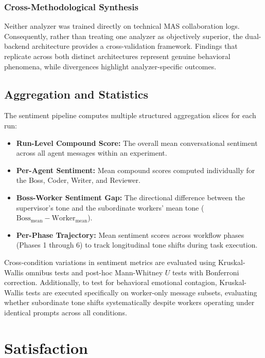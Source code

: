 \subsubsection{Cross-Methodological Synthesis}
\label{subsubsec:cross-methodological-synthesis}

Neither analyzer was trained directly on technical \ac{MAS} collaboration logs.
Consequently, rather than treating one analyzer as objectively superior, the dual-backend architecture provides a cross-validation framework.
Findings that replicate across both distinct architectures represent genuine behavioral phenomena, while divergences highlight analyzer-specific outcomes.

\subsection{Aggregation and Statistics}
\label{subsec:sentiment-aggregation-statistics}

The sentiment pipeline computes multiple structured aggregation slices for each run:
\begin{itemize}
    \item \textbf{Run-Level Compound Score:} The overall mean conversational sentiment across all agent messages within an experiment.
    \item \textbf{Per-Agent Sentiment:} Mean compound scores computed individually for the Boss, Coder, Writer, and Reviewer.
    \item \textbf{Boss-Worker Sentiment Gap:} The directional difference between the supervisor's tone and the subordinate workers' mean tone ($\text{Boss}_{\text{mean}} - \text{Worker}_{\text{mean}}$).
    \item \textbf{Per-Phase Trajectory:} Mean sentiment scores across workflow phases (Phases 1 through 6) to track longitudinal tone shifts during task execution.
\end{itemize}
Cross-condition variations in sentiment metrics are evaluated using Kruskal-Wallis omnibus tests and post-hoc Mann-Whitney $U$ tests with Bonferroni correction.
Additionally, to test for behavioral emotional contagion, Kruskal-Wallis tests are executed specifically on worker-only message subsets, evaluating whether subordinate tone shifts systematically despite workers operating under identical prompts across all conditions.

\section{Satisfaction}
\label{sec:eval-satisfaction}

